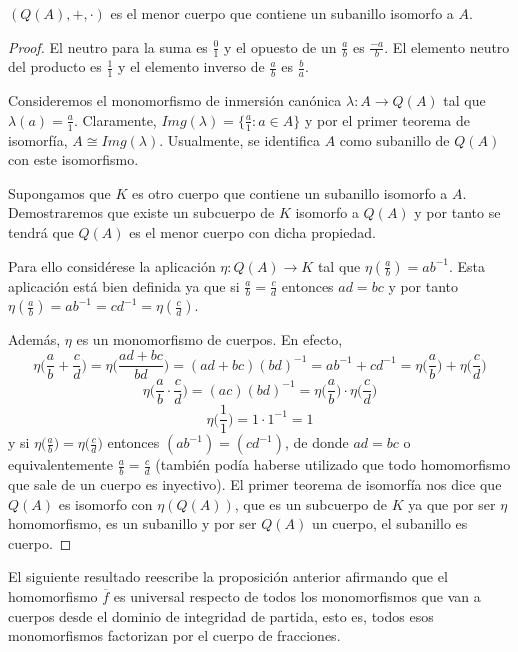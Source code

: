 \begin{proposition}
$(Q(A),+,\cdot)$ es el menor cuerpo que contiene un subanillo isomorfo a $A$.  
\end{proposition}
\begin{proof}
El neutro para la suma es $\frac{0}{1}$ y el opuesto de un $\frac{a}{b}$ es $\frac{-a}{b}$. El elemento neutro del producto es $\frac{1}{1}$ y el elemento inverso de $\frac{a}{b}$ es $\frac{b}{a}$. 

Consideremos el monomorfismo de inmersión canónica $ \lambda: A \to Q(A)$ tal que $\lambda(a) = \frac{a}{1}$. Claramente, $Img(\lambda) = \{\frac{a}{1}:a \in A\}$ y por el primer teorema de isomorfía, $A \cong Img(\lambda)$. Usualmente, se identifica $A$ como subanillo de $Q(A)$ con este isomorfismo. 

Supongamos que $K$ es otro cuerpo que contiene un subanillo isomorfo a $A$. Demostraremos que existe un subcuerpo de $K$ isomorfo a $Q(A)$  y por tanto se tendrá que $Q(A)$ es el menor cuerpo con dicha propiedad. 

Para ello considérese la aplicación $\eta:Q(A) \to K$ tal que $\eta(\frac{a}{b}) = ab^{-1}$. Esta aplicación está bien definida ya que si $\frac{a}{b} = \frac{c}{d}$ entonces $ad = bc$ y por tanto $\eta(\frac{a}{b}) = ab^{-1} = cd^{-1} = \eta(\frac{c}{d})$.  

Además, $\eta$ es un monomorfismo de cuerpos. En efecto, $$\eta\Big(\frac{a}{b} + \frac{c}{d}\Big) = \eta\Big(\frac{ad+bc}{bd}\Big) = (ad+bc)(bd)^{-1} = ab^{-1} + cd^{-1} = \eta\Big(\frac{a}{b}\Big) + \eta\Big(\frac{c}{d}\Big)$$ $$\eta\Big(\frac{a}{b} \cdot \frac{c}{d}\Big) = (ac)(bd)^{-1} = \eta\Big(\frac{a}{b}\Big) \cdot \eta\Big(\frac{c}{d}\Big)$$ $$\eta\Big(\frac{1}{1}\Big) = 1 \cdot 1^{-1} = 1$$ y si $\eta\Big(\frac{a}{b}\Big) = \eta\Big(\frac{c}{d}\Big)$ entonces $(ab^{-1}) = (cd^{-1})$, de donde $ad = bc$ o equivalentemente $\frac{a}{b} = \frac{c}{d}$ (también podía haberse utilizado que todo homomorfismo que sale de un cuerpo es inyectivo). El primer teorema de isomorfía nos dice que $Q(A)$ es isomorfo con $\eta(Q(A))$, que es un subcuerpo de $K$ ya que por ser $\eta$ homomorfismo, es un subanillo y por ser $Q(A)$ un cuerpo, el subanillo es cuerpo. 
\end{proof}

El siguiente resultado reescribe la proposición anterior afirmando que el homomorfismo $\overline{f}$ es universal respecto de todos los monomorfismos que van a cuerpos desde el dominio de integridad de partida, esto es, todos esos monomorfismos factorizan por el cuerpo de fracciones. 

